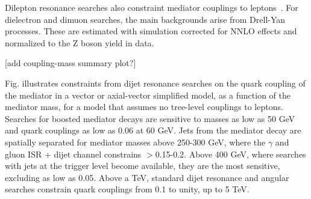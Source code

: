 Dilepton resonance searches also constraint mediator couplings to leptons~\cite{Aaboud:2017buh,Khachatryan:2016zqb}. 
For dielectron and dimuon searches, the main backgrounds arise from Drell-Yan processes. These are estimated with simulation corrected for NNLO effects and normalized to the Z boson yield in data.



[add coupling-mass summary plot?]

Fig. illustrates constraints from dijet resonance searches on the quark coupling of the mediator in a vector or axial-vector simplified model, as a function of the mediator mass, for a model that assumes no tree-level couplings to leptons.
Searches for boosted mediator decays are sensitive to masses as low as 50 GeV and quark couplings \gq as low as 0.06 at 60 GeV.
Jets from the mediator decay are spatially separated for mediator masses above 250-300 GeV, where the $\gamma$ and gluon ISR + dijet channel constrains \gq$>$0.15-0.2.
Above 400 GeV, where searches with jets at the trigger level become available, they are the most sensitive, excluding \gq as low as 0.05.
Above a TeV, standard dijet resonance and angular searches constrain quark couplings from 0.1 to unity, up to 5 TeV. 

